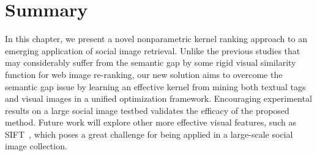 \section{Summary} \label{sec:rerank-conclusion}

In this chapter, we present a novel nonparametric kernel ranking approach to an emerging application of social image retrieval. Unlike the previous studies that may considerably suffer from the semantic gap by some rigid visual similarity function for web image re-ranking, our new solution aims to overcome the semantic gap issue by learning an effective kernel from mining both textual tags and visual images in a unified optimization framework. Encouraging experimental results on a large social image testbed validates the efficacy of the proposed method. Future work will explore other more effective visual features, such as SIFT~\cite{jcv/LoweG04}, which poses a great challenge for being applied in a large-scale social image collection.






